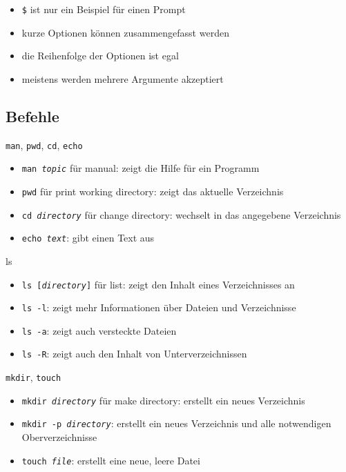 \begin{frame}
  \begin{itemize}
    \item \texttt{\$} ist nur ein Beispiel für einen Prompt
    \item kurze Optionen können zusammengefasst werden
    \item die Reihenfolge der Optionen ist egal
    \item meistens werden mehrere Argumente akzeptiert
  \end{itemize}
\end{frame}

\subsection{Befehle}
\begin{frame}{\texttt{man}, \texttt{pwd}, \texttt{cd}, \texttt{echo}}
  \begin{itemize}
    \item \texttt{man \textit{topic}} für manual: zeigt die Hilfe für ein Programm
    \item \texttt{pwd} für print working directory: zeigt das aktuelle Verzeichnis
    \item \texttt{cd \textit{directory}} für change directory: wechselt in das angegebene Verzeichnis
    \item \texttt{echo \textit{text}}: gibt einen Text aus
  \end{itemize}
\end{frame}

\begin{frame}{ls}
  \begin{itemize}
    \item \texttt{ls [\textit{directory}]} für list: zeigt den Inhalt eines Verzeichnisses an
    \item \texttt{ls -l}: zeigt mehr Informationen über Dateien und Verzeichnisse
    \item \texttt{ls -a}: zeigt auch versteckte Dateien
    \item \texttt{ls -R}: zeigt auch den Inhalt von Unterverzeichnissen
  \end{itemize}
\end{frame}

\begin{frame}{\texttt{mkdir}, \texttt{touch}}
  \begin{itemize}
    \item \texttt{mkdir \textit{directory}} für make directory: erstellt ein neues Verzeichnis
    \item \texttt{mkdir -p \textit{directory}}: erstellt ein neues Verzeichnis und alle notwendigen Oberverzeichnisse
    \item \texttt{touch \textit{file}}: erstellt eine neue, leere Datei
  \end{itemize}
\end{frame}

